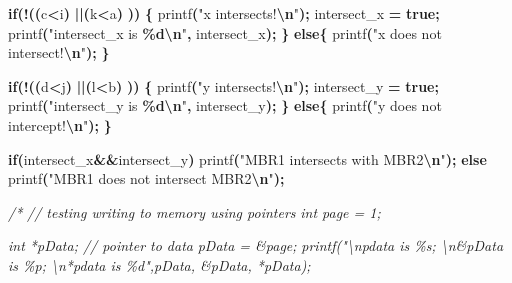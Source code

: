 \documentclass[
]{book}
\newenvironment{Shaded}{\begin{snugshade}}{\end{snugshade}}
\newcommand{\CommentTok}[1]{\textcolor[rgb]{0.56,0.35,0.01}{\textit{#1}}}
\newcommand{\ControlFlowTok}[1]{\textcolor[rgb]{0.13,0.29,0.53}{\textbf{#1}}}
\newcommand{\KeywordTok}[1]{\textcolor[rgb]{0.13,0.29,0.53}{\textbf{#1}}}
\newcommand{\NormalTok}[1]{#1}
\newcommand{\OperatorTok}[1]{\textcolor[rgb]{0.81,0.36,0.00}{\textbf{#1}}}
\newcommand{\SpecialCharTok}[1]{\textcolor[rgb]{0.81,0.36,0.00}{\textbf{#1}}}
\newcommand{\StringTok}[1]{\textcolor[rgb]{0.31,0.60,0.02}{#1}}
\begin{document}
\begin{Shaded}
\begin{Highlighting}[]
    \ControlFlowTok{if}\OperatorTok{(!((}\NormalTok{c}\OperatorTok{\textless{}}\NormalTok{i}\OperatorTok{)} \OperatorTok{||(}\NormalTok{k}\OperatorTok{\textless{}}\NormalTok{a}\OperatorTok{)} \OperatorTok{))}
    \OperatorTok{\{}
\NormalTok{        printf}\OperatorTok{(}\StringTok{"x intersects!}\SpecialCharTok{\textbackslash{}n}\StringTok{"}\OperatorTok{);}
\NormalTok{        intersect\_x }\OperatorTok{=} \KeywordTok{true}\OperatorTok{;}
\NormalTok{        printf}\OperatorTok{(}\StringTok{"intersect\_x is }\SpecialCharTok{\%d\textbackslash{}n}\StringTok{"}\OperatorTok{,}\NormalTok{ intersect\_x}\OperatorTok{);}
    \OperatorTok{\}} \ControlFlowTok{else}\OperatorTok{\{}
\NormalTok{        printf}\OperatorTok{(}\StringTok{"x does not intersect!}\SpecialCharTok{\textbackslash{}n}\StringTok{"}\OperatorTok{);}
    \OperatorTok{\}}

    \ControlFlowTok{if}\OperatorTok{(!((}\NormalTok{d}\OperatorTok{\textless{}}\NormalTok{j}\OperatorTok{)} \OperatorTok{||(}\NormalTok{l}\OperatorTok{\textless{}}\NormalTok{b}\OperatorTok{)} \OperatorTok{))}
    \OperatorTok{\{}
\NormalTok{        printf}\OperatorTok{(}\StringTok{"y intersects!}\SpecialCharTok{\textbackslash{}n}\StringTok{"}\OperatorTok{);}
\NormalTok{        intersect\_y }\OperatorTok{=} \KeywordTok{true}\OperatorTok{;}
\NormalTok{        printf}\OperatorTok{(}\StringTok{"intersect\_y is }\SpecialCharTok{\%d\textbackslash{}n}\StringTok{"}\OperatorTok{,}\NormalTok{ intersect\_y}\OperatorTok{);}
    \OperatorTok{\}} \ControlFlowTok{else}\OperatorTok{\{}
\NormalTok{        printf}\OperatorTok{(}\StringTok{"y does not intercept!}\SpecialCharTok{\textbackslash{}n}\StringTok{"}\OperatorTok{);}
    \OperatorTok{\}}

    \ControlFlowTok{if}\OperatorTok{(}\NormalTok{intersect\_x}\OperatorTok{\&\&}\NormalTok{intersect\_y}\OperatorTok{)}
\NormalTok{        printf}\OperatorTok{(}\StringTok{"MBR1 intersects with MBR2}\SpecialCharTok{\textbackslash{}n}\StringTok{"}\OperatorTok{);}
    \ControlFlowTok{else}
\NormalTok{        printf}\OperatorTok{(}\StringTok{"MBR1 does not intersect MBR2}\SpecialCharTok{\textbackslash{}n}\StringTok{"}\OperatorTok{);}



\CommentTok{/*}
\CommentTok{    // testing writing to memory using pointers}
\CommentTok{    int page = 1;}

\CommentTok{    int *pData; // pointer to data}
\CommentTok{    pData = \&page;}
\CommentTok{    printf("\textbackslash{}npdata is \%s; \textbackslash{}n\&pData is \%p; \textbackslash{}n*pdata is \%d",pData, \&pData, *pData);}


\end{Highlighting}
\end{Shaded}
\end{document}
